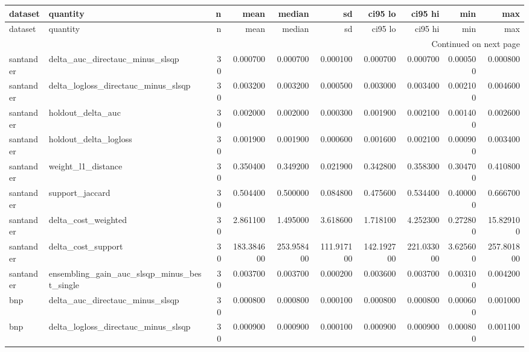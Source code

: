 \begin{landscape}
\begin{center}\label{tab:s9conf}\end{center}
\begingroup\tiny\setlength{\tabcolsep}{2.5pt}
\begin{longtable}{llrrrrrrrr}
\toprule
dataset & quantity & n & mean & median & sd & ci95 lo & ci95 hi & min & max \\
\midrule
\endfirsthead
\toprule
dataset & quantity & n & mean & median & sd & ci95 lo & ci95 hi & min & max \\
\midrule
\endhead
\midrule
\multicolumn{10}{r}{Continued on next page} \\
\midrule
\endfoot
\bottomrule
\endlastfoot
santander & delta\_auc\_directauc\_minus\_slsqp & 30 & 0.000700 & 0.000700 & 0.000100 & 0.000700 & 0.000700 & 0.000500 & 0.000800 \\
santander & delta\_logloss\_directauc\_minus\_slsqp & 30 & 0.003200 & 0.003200 & 0.000500 & 0.003000 & 0.003400 & 0.002100 & 0.004600 \\
santander & holdout\_delta\_auc & 30 & 0.002000 & 0.002000 & 0.000300 & 0.001900 & 0.002100 & 0.001400 & 0.002600 \\
santander & holdout\_delta\_logloss & 30 & 0.001900 & 0.001900 & 0.000600 & 0.001600 & 0.002100 & 0.000900 & 0.003400 \\
santander & weight\_l1\_distance & 30 & 0.350400 & 0.349200 & 0.021900 & 0.342800 & 0.358300 & 0.304700 & 0.410800 \\
santander & support\_jaccard & 30 & 0.504400 & 0.500000 & 0.084800 & 0.475600 & 0.534400 & 0.400000 & 0.666700 \\
santander & delta\_cost\_weighted & 30 & 2.861100 & 1.495000 & 3.618600 & 1.718100 & 4.252300 & 0.272800 & 15.829100 \\
santander & delta\_cost\_support & 30 & 183.384600 & 253.958400 & 111.917100 & 142.192700 & 221.033000 & 3.625600 & 257.801800 \\
santander & ensembling\_gain\_auc\_slsqp\_minus\_best\_single & 30 & 0.003700 & 0.003700 & 0.000200 & 0.003600 & 0.003700 & 0.003100 & 0.004200 \\
bnp & delta\_auc\_directauc\_minus\_slsqp & 30 & 0.000800 & 0.000800 & 0.000100 & 0.000800 & 0.000800 & 0.000600 & 0.001000 \\
bnp & delta\_logloss\_directauc\_minus\_slsqp & 30 & 0.000900 & 0.000900 & 0.000100 & 0.000900 & 0.000900 & 0.000800 & 0.001100 \\

\end{longtable}
\end{landscape}
